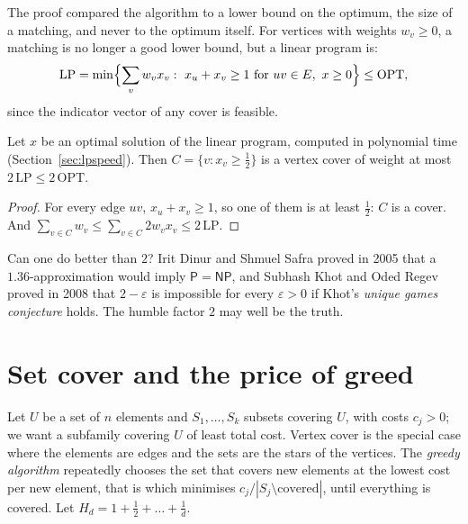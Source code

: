 The proof compared the algorithm to a lower bound on the optimum, the size of a matching, and never to the optimum itself. For vertices with weights $w_v\ge0$, a matching is no longer a good lower bound, but a linear program is:
\[
\mathrm{LP}=\min\Bigl\{\sum_vw_vx_v:\ x_u+x_v\ge1\text{ for }uv\in E,\ x\ge0\Bigr\}\le\mathrm{OPT},
\]
since the indicator vector of any cover is feasible.

\begin{proposition}\label{prop:vclp}
Let $x$ be an optimal solution of the linear program, computed in polynomial time (Section~\ref{sec:lpspeed}). Then $C=\{v:x_v\ge\frac12\}$ is a vertex cover of weight at most $2\,\mathrm{LP}\le2\,\mathrm{OPT}$.
\end{proposition}
\begin{proof}
For every edge $uv$, $x_u+x_v\ge1$, so one of them is at least $\frac12$: $C$ is a cover. And $\sum_{v\in C}w_v\le\sum_{v\in C}2w_vx_v\le2\,\mathrm{LP}$.
\end{proof}

Can one do better than $2$? Irit Dinur and Shmuel Safra proved in 2005 that a $1.36$-approximation would imply $\mathsf P=\mathsf{NP}$, and Subhash Khot and Oded Regev proved in 2008 that $2-\varepsilon$ is impossible for every $\varepsilon>0$ if Khot's \emph{unique games conjecture} holds. The humble factor $2$ may well be the truth.

\section{Set cover and the price of greed}\label{sec:setcover}

Let $U$ be a set of $n$ elements and $S_1,\dots,S_k$ subsets covering $U$, with costs $c_j>0$; we want a subfamily covering $U$ of least total cost. Vertex cover is the special case where the elements are edges and the sets are the stars of the vertices. The \emph{greedy algorithm} repeatedly chooses the set that covers new elements at the lowest cost per new element, that is which minimises $c_j/|S_j\setminus\text{covered}|$, until everything is covered. Let $H_d=1+\frac12+\dots+\frac1d$.

